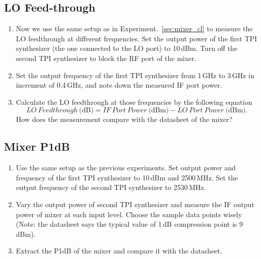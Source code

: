 \documentclass[letterpaper, 11pt]{article}
\begin{document}
\subsection{LO Feed-through}

\begin{enumerate}
	\item Now we use the same setup as in Experiment.~\ref{sec:mixer_cl} to measure the LO feedthrough at different frequencies. Set the output power of the  first TPI synthesizer (the one connected to the LO port) to 10\,dBm. Turn off the second TPI synthesizer to block the RF port of the mixer. 
	
	\item Set the output frequency of the first TPI synthesizer from 1\,GHz to 3\,GHz in increment of 0.4\,GHz, and note down the measured IF port power. 

	\item Calculate the LO feedthrough at those frequencies by the following equation
	\[
		LO~Feedthrough~\text{(dB)} = IF~Port~Power~\text{(dBm)} - LO~Port~Power~\text{(dBm)}.
	\]
		How does the measurement compare with the datasheet of the mixer?
	
\end{enumerate}

\subsection{Mixer P1dB}

\begin{enumerate}
	\item Use the same setup as the previous experiments. Set output power and frequency of the first TPI synthesizer to 10\,dBm and 2500\,MHz. Set the output frequency of the second TPI synthesizer to 2530\,MHz. 

	\item Vary the output power of second TPI synthesizer and measure the IF output power of mixer at each input level. Choose the sample data points wisely (Note: the datasheet says the typical value of 1\,dB compression point is 9\,dBm). 

	\item Extract the P1dB of the mixer and compare it with the datasheet. 

\end{enumerate}


%
% 
%
%
%
\end{document}

